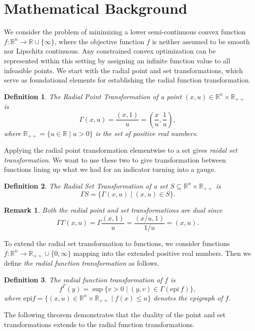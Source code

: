 \documentclass{article}
\newtheorem{definition}{Definition}[section]
\newtheorem{remark}{Remark}[section]
\begin{document}
\section{Mathematical Background}
\label{Math:Background}
We consider the problem of minimizing a lower semi-continuous convex function $f: \mathbb{R}^n \rightarrow \mathbb{R}\cup \{\infty\}$, where the objective function $f$ is neither assumed to be smooth nor Lipschitz continuous. Any constrained convex optimization can be represented within this setting by assigning an infinite function value to all infeasible points. We start with the radial point and set transformations, which serve as foundational elements for establishing the radial function transformation. 
\begin{definition}
    The Radial Point Transformation of a point $(x, u) \in \mathbb{R}^n \times \mathbb{R}_{++}$ is
\[
\Gamma (x,u)=\frac{(x,1)}{u}=(\frac{x}{u},\frac{1}{u}),
\]
where $\mathbb{R}_{++} = \{ u \in \mathbb{R} \mid u > 0\}$ is the set of positive real numbers.
\end{definition}

Applying the radial point transformation elementwise
to a set gives \emph{raidal set transformation}. We want to use these two to give transformation between functions lining up what we had for an indicator turning into a gauge. 
\begin{definition}
    The Radial Set Transformation of a set $S \subseteq \mathbb{R}^n \times \mathbb{R}_{++}$ is
\[
\Gamma S=\{\Gamma(x, u) \mid(x, u) \in S\}. 
\]
\end{definition}
\begin{remark}
    Both the radial point and set transformations are dual since
\begin{equation*}
    \Gamma\Gamma (x,u)=\Gamma\frac{(x,1)}{u}=\frac{(x/u,1)}{1/u}=(x,u).
\end{equation*}
\end{remark}

To extend the radial set transformation to functions, we consider functions $f: \mathbb{R}^n \rightarrow \mathbb{R}_{++} \cup \{0,\infty\}$ mapping into the extended positive real numbers. Then we define \textit{the radial function transformation} as follows.

\begin{definition}
    The radial function transformation of $f$ is
    \[
    f^{\Gamma}(y)= \sup \{v>0 \mid (y,v) \in \Gamma(\mathrm{epi} \ f)\},
    \]
    where $\mathrm{epi} f = \{ (x,u)\in \mathbb{R}^n \times \mathbb{R}_{++} \mid f(x) \leq u \}$ denotes the epigraph of $f$.
\end{definition}
The following theorem demonstrates that the duality of the point and set transformations extends to the radial function transformations.
\end{document}
